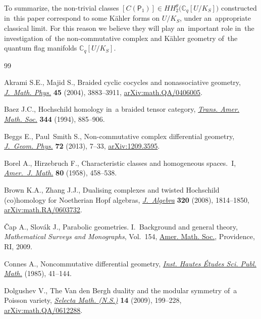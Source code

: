 \documentclass[10pt,a4paper]{amsart}
\numberwithin{equation}{section}
\newcommand{\Cqflag}{\mathbb{C}_q[U / K_S]}
\newcommand{\proj}{\mathsf{P}}
\begin{document}
To summarize, the non-trivial classes $[C(\proj_1)] \in HH^\theta_2\big(\Cqflag\big)$ constructed in~this paper correspond to some K\"ahler forms on $U / K_S$, under an~appropriate classical limit.
For this reason we believe they will play an~important role in~the investigation of~the non-commutative complex and K\"ahler geometry of~the quantum flag manifolds $\Cqflag$.


\begin{thebibliography}{99}
\footnotesize\itemsep=0pt

Akrami S.E., Majid S., Braided cyclic cocycles and nonassociative geometry,
 \href{https://doi.org/10.1063/1.1787621}{\textit{J.~Math. Phys.}} \textbf{45} (2004), 3883--3911,
 \href{https://arxiv.org/abs/math.QA/0406005}{arXiv:math.QA/0406005}.

Baez J.C., Hoch\-schild homology in~a braided tensor category, \href{https://doi.org/10.2307/2154514}{\textit{Trans.
 Amer. Math. Soc.}} \textbf{344} (1994), 885--906.

Beggs E., Paul~Smith S., Non-commutative complex differential geometry,
 \href{https://doi.org/10.1016/j.geomphys.2013.03.018}{\textit{J.~Geom. Phys.}} \textbf{72} (2013), 7--33, \href{https://arxiv.org/abs/1209.3595}{arXiv:1209.3595}.

Borel A., Hirzebruch F., Characteristic classes and homogeneous spaces.~{I},
 \href{https://doi.org/10.2307/2372795}{\textit{Amer.~J. Math.}} \textbf{80} (1958), 458--538.

Brown K.A., Zhang J.J., Dualising complexes and twisted {H}ochschild
 (co)homology for {N}oetherian {H}opf algebras, \href{https://doi.org/10.1016/j.jalgebra.2007.03.050}{\textit{J.~Algebra}}
 \textbf{320} (2008), 1814--1850, \href{https://arxiv.org/abs/math.RA/0603732}{arXiv:math.RA/0603732}.


\v{C}ap A., Slov\'ak J., Parabolic geometries. {I}.~Background and general
 theory, \textit{Mathematical Surveys and Monographs}, Vol.~154, \href{https://doi.org/10.1090/surv/154}{Amer. Math.
 Soc.}, Providence, RI, 2009.

Connes A., Noncommutative differential geometry, \href{https:////doi.org/10.1007/BF02698807}{\textit{Inst. Hautes
 \'Etudes Sci. Publ. Math.}} (1985), 41--144.

Dolgushev V., The {V}an den {B}ergh duality and the modular symmetry of~a
 {P}oisson variety, \href{https://doi.org/10.1007/s00029-008-0062-z}{\textit{Selecta Math. (N.S.)}} \textbf{14} (2009),
 199--228, \href{https://arxiv.org/abs/math.QA/0612288}{arXiv:math.QA/0612288}.


\end{thebibliography}
\end{document}
